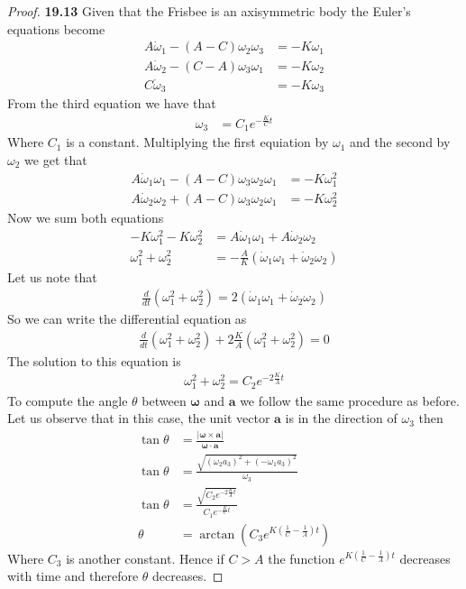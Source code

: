 \documentclass[11pt]{article}
\theoremstyle{definition}
\begin{document}
\begin{proof}{\textbf{19.13}}
    Given that the Frisbee is an axisymmetric body the Euler's equations
    become
    \begin{align*}
        A\dot\omega_1 - (A - C)\omega_2\omega_3 &= -K \omega_1\\
        A\dot\omega_2 - (C - A)\omega_3\omega_1 &= -K \omega_2\\
        C\dot\omega_3 &= -K \omega_3
    \end{align*}
    From the third equation we have that
    \begin{align*}
        \omega_3 &= C_1 e^{-\frac{K}{C} t}
    \end{align*}
    Where $C_1$ is a constant.
    Multiplying the first equiation by $\omega_1$ and the second by $\omega_2$
    we get that
    \begin{align*}
        A\dot\omega_1\omega_1 - (A - C)\omega_3\omega_2\omega_1
        &= -K \omega_1^2\\
        A\dot\omega_2\omega_2 + (A - C)\omega_3\omega_2\omega_1
        &= -K \omega_2^2
    \end{align*}
    Now we sum both equations
    \begin{align*}
        -K \omega_1^2 -K \omega_2^2
        &= A\dot\omega_1\omega_1 + A\dot\omega_2\omega_2\\
        \omega_1^2 + \omega_2^2
        &= -\frac{A}{K}(\dot\omega_1\omega_1 + \dot\omega_2\omega_2)
    \end{align*}
    Let us note that
    \begin{align*}
        \frac{d}{dt}(\omega_1^2 + \omega_2^2)
        = 2(\dot\omega_1\omega_1 + \dot\omega_2\omega_2)
    \end{align*}
    So we can write the differential equation as
    \begin{align*}
        \frac{d}{dt}(\omega_1^2 + \omega_2^2) 
        + 2\frac{K}{A}(\omega_1^2 + \omega_2^2) = 0
    \end{align*}
    The solution to this equation is
    \begin{align*}
        \omega_1^2 + \omega_2^2 = C_2e^{- 2\frac{K}{A}t}
    \end{align*}
    To compute the angle $\theta$ between $\bm\omega$ and $\bm a$ we follow
    the same procedure as before. Let us observe that in this case, the unit
    vector $\bm{a}$ is in the direction of $\omega_3$ then
    \begin{align*}
        \tan\theta
        &= \frac{|\bm{\omega} \times \bm{a}|}{\bm{\omega} \cdot \bm{a}}\\
        \tan\theta
        &= \frac{\sqrt{(\omega_2 a_3)^2 + (-\omega_1 a_3)^2}}{\omega_3}\\
        \tan\theta
        &= \frac{\sqrt{C_2e^{- 2\frac{K}{A}t}}}{C_1 e^{-\frac{K}{C} t}}\\
        \theta &= \arctan(C_3e^{K(\frac{1}{C}-\frac{1}{A})t})
    \end{align*}
    Where $C_3$ is another constant.
    Hence if $C > A$ the function $e^{K(\frac{1}{C}-\frac{1}{A})t}$ decreases
    with time and therefore $\theta$ decreases.
\end{proof}
\end{document}
